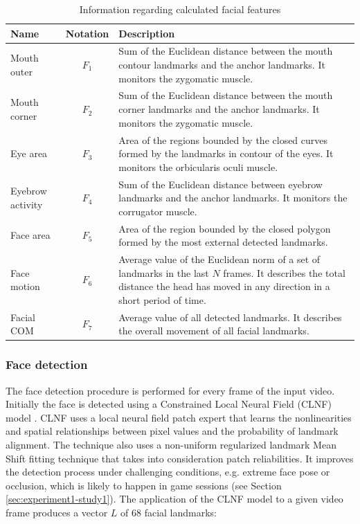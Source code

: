 \begin{landscape}
\begin{table}
    \centering
    \caption{Information regarding calculated facial features}
    \label{table:features}
    \begin{tabular}[l]{@{}lcp{11cm}}
        \toprule%
            \textbf{Name} & \textbf{Notation} & \textbf{Description} \\
        \midrule%
            Mouth outer & $F_1$ & Sum of the Euclidean distance between the mouth contour landmarks and the anchor landmarks. It monitors the zygomatic muscle.  \\
            Mouth corner & $F_2$ & Sum of the Euclidean distance between the mouth corner landmarks and the anchor landmarks. It monitors the zygomatic muscle. \\
            Eye area & $F_3$ & Area of the regions bounded by the closed curves formed by the landmarks in contour of the eyes. It monitors the orbicularis oculi muscle. \\
            Eyebrow activity & $F_4$ & Sum of the Euclidean distance between eyebrow landmarks and the anchor landmarks. It monitors the corrugator muscle.  \\
            Face area & $F_5$ & Area of the region bounded by the closed polygon formed by the most external detected landmarks.  \\
            Face motion & $F_6$ & Average value of the Euclidean norm of a set of landmarks in the last $N$ frames. It describes the total distance the head has moved in any direction in a short period of time.  \\
            Facial COM & $F_7$ & Average value of all detected landmarks. It describes the overall movement of all facial landmarks.  \\
        \bottomrule%
    \end{tabular}
\end{table}
\end{landscape}

\subsubsection{Face detection}

The face detection procedure is performed for every frame of the input video. Initially the face is detected using a Constrained Local Neural Field (CLNF) model \parencite{baltrusaitis2013constrained,baltruvsaitis2016openface}. CLNF uses a local neural field patch expert that learns the nonlinearities and spatial relationships between pixel values and the probability of landmark alignment. The technique also uses a non-uniform regularized landmark Mean Shift fitting technique that takes into consideration patch reliabilities. It improves the detection process under challenging conditions, e.g. extreme face pose or occlusion, which is likely to happen in game sessions (see Section \ref{sec:experiment1-study1}). The application of the CLNF model to a given video frame produces a vector $L$ of 68 facial landmarks:

